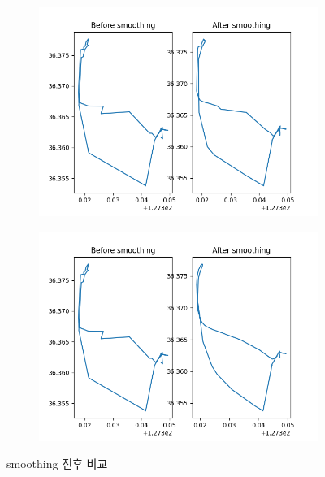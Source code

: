 \documentclass{oblivoir}
\begin{document}
  \begin{figure}[H]
    \centering
    \begin{subfigure}[b]{0.5\textwidth}
      \centering
      \includegraphics[width=\textwidth]{GPS_preprocess_5.png}        
    \end{subfigure}%
    \begin{subfigure}[b]{0.5\textwidth}
      \centering
      \includegraphics[width=\textwidth]{GPS_preprocess_6.png}
    \end{subfigure}
    \caption{smoothing 전후 비교}
  \end{figure}
    
\end{document}

